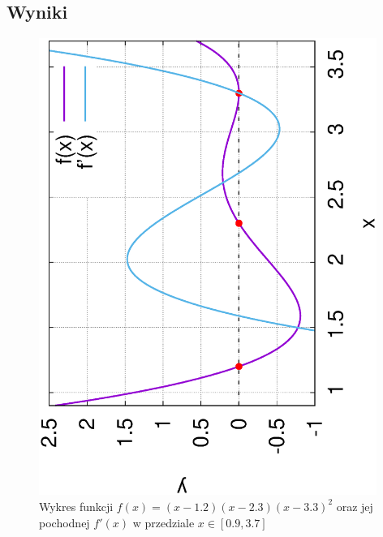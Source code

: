 \documentclass{article}
\begin{document}
\subsection{Wyniki}

\begin{figure}[H]
\includegraphics[width=11cm]{wielomian.eps}
\centering
\caption{Wykres funkcji $f(x) = (x - 1.2)(x - 2.3)(x-3.3)^2$ oraz jej pochodnej $f'(x)$ w przedziale $x \in [0.9, 3.7]$}
\end{figure}
\end{document}
